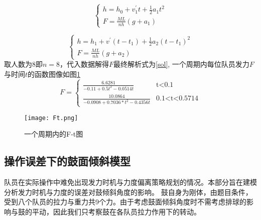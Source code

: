 \documentclass[withoutpreface,bwprint]{cumcmthesis} %
\begin{document}
\begin{equation}
\left\{
\begin{array}{lr}
h=h_0+v_1^{'}t+\frac{1}{2}a_1t^2\\
F=\frac{ML}{nh}(g+a_1)
\end{array}
\right.
\label{stage1}
\end{equation}

\begin{equation}
\left\{
\begin{array}{lr}
h=h_1+v^{'}(t-t_1)+\frac{1}{2}a_2(t-t_1)^2\\
F=\frac{ML}{nh}(g+a_2)
\end{array}
\right.
\label{stage2}
\end{equation}
取人数为8即$n=8$，代入数据解得$F$最终解析式为\ref{sol}, 一个周期内每位队员发力$F$与时间$t$的函数图像如图\ref{fig:Ft}
\begin{equation}
F=
\begin{cases}
\frac{6.6281}{-0.11+0.5t^2-0.0514t}& \text{t<0.1}\\
\frac{10.0864}{-0.0908+0.7036*t^2-0.4356t}& \text{0.1<t<0.5714}
\end{cases}
\label{sol}
\end{equation}

\begin{figure}
	\centering
	\texttt{[image: Ft.png]}
	\caption{一个周期内的F-t图}
	\label{fig:Ft} %
\end{figure}

\subsection{操作误差下的鼓面倾斜模型}
队员在实际操作中难免出现发力时机与力度偏离策略规划的情况。本部分旨在建模分析发力时机与力度的误差对鼓倾斜角度的影响。
鼓自身为刚体，由题目条件，受到八个队员的拉力与重力共9个力。由于考虑鼓面倾斜角度时不需考虑排球的影响与鼓的平动，因此我们只考察鼓在各队员拉力作用下的转动。
\end{document}
